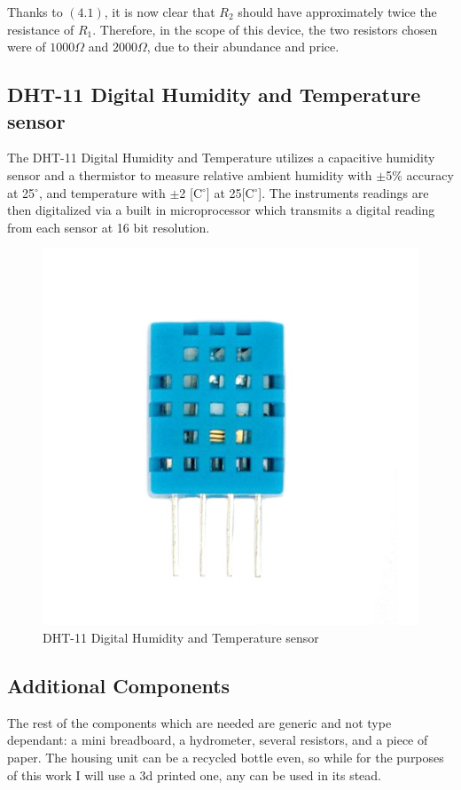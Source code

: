 \documentclass[twoside]{ctuthesis}
\theoremstyle{plain}
\theoremstyle{definition}
\theoremstyle{note}
\begin{document}
Thanks to $(4.1)$, it is now clear that $R_2$ should have approximately twice the resistance of $R_1$. Therefore, in the scope of this device, the two resistors chosen were of $1000\Omega$ and $2000\Omega$, due to their abundance and price.


\subsection{DHT-11 Digital Humidity and Temperature sensor}
The DHT-11 Digital Humidity and Temperature utilizes a capacitive humidity sensor and a thermistor to measure relative ambient humidity with $\pm$5$\%$ accuracy at 25$^\circ$, and temperature with $\pm$2 [C$^\circ$] at 25[C$^\circ$]. The instruments readings are then digitalized via a built in microprocessor which transmits a digital reading from each sensor at 16 bit resolution.

\begin{figure}[H]
	\centering
	\includegraphics[scale=0.5]{DHT11}
	\caption{DHT-11 Digital Humidity and Temperature sensor\cite{HC-SR04}}
\end{figure}

\subsection{Additional Components}
The rest of the components which are needed are generic and not type dependant: a mini breadboard, a hydrometer, several resistors, and a piece of paper. The housing unit can be a recycled bottle even, so while for the purposes of this work I will use a 3d printed one, any can be used in its stead.\\
\end{document}

